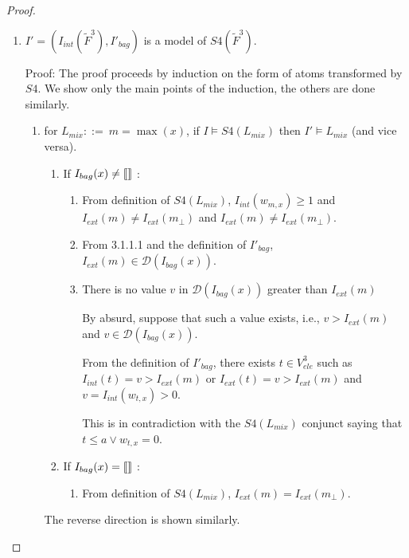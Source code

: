 \begin{proof}
\begin{enumerate}[1.]
\item %
$I'=(I_{int}(\tilde{F}^3),I'_{bag})$ is a model of $S4(\tilde{F}^3)$.

Proof: The proof proceeds by induction on the form of atoms transformed by $S4$. We show only the main points of the induction, the others are done similarly.



\begin{enumerate}[3.1]
\item %
for $L_{mix} ::=\ m = \max(x)$, if $I \models S4(L_{mix})$ then $I'\models L_{mix}$ (and vice versa). \\

\begin{enumerate}[$\mbox{3.1.}1$]
\item %
If $I_{bag}(x) \neq \llbracket  \rrbracket$ : \\
\begin{enumerate}[$\mbox{3.1.1.}1$]
\item %
From definition of $S4(L_{mix})$, $I_{int}(w_{m,x}) \ge 1$ and $I_{ext}(m) \neq I_{ext}(m_{\bot})$ and $I_{ext}(m) \neq I_{ext}(m_{\bot})$.

\item %
From 3.1.1.1 and the definition of $I'_{bag}$, $I_{ext}(m) \in \mathcal{D}(I_{bag}(x))$.

\item %
There is no value $v$ in $\mathcal{D}(I_{bag}(x))$ greater than $I_{ext}(m)$

   By absurd, suppose that such a value exists, i.e., $v > I_{ext}(m)$ and $v \in \mathcal{D}(I_{bag}(x))$.

   From the definition of $I'_{bag}$, there exists $t\in V^3_{ele}$ such as $I_{int}(t)=v > I_{ext}(m)$ or $I_{ext}(t)=v > I_{ext}(m)$  and $v = I_{int}(w_{t,x}) > 0$.

   This is in contradiction with the $S4(L_{mix})$ conjunct saying that $t\le a \lor w_{t,x}=0$.
\end{enumerate}
\item %
If $I_{bag}(x) = \llbracket  \rrbracket$ : \\
\begin{enumerate}[$\mbox{3.1.2.}1$]
\item From definition of $S4(L_{mix})$, $I_{ext}(m) = I_{ext}(m_{\bot})$.
\end{enumerate}
\end{enumerate}
The reverse direction is shown similarly.


\end{enumerate}
\end{enumerate}
\end{proof}
